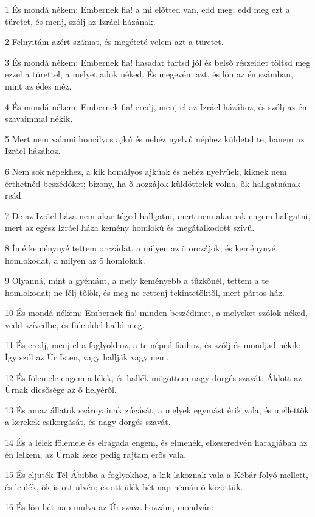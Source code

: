 \par 1 És mondá nékem: Embernek fia! a mi elõtted van, edd meg; edd meg ezt a türetet, és menj, szólj az Izráel házának.
\par 2 Felnyitám azért számat, és megéteté velem azt a türetet.
\par 3 És mondá nékem: Embernek fia! hasadat tartsd jól és belsõ részeidet töltsd meg ezzel a türettel, a melyet adok néked. És megevém azt, és lõn az én számban, mint az édes méz.
\par 4 És mondá nékem: Embernek fia! eredj, menj el az Izráel házához, és szólj az én szavaimmal nékik.
\par 5 Mert nem valami homályos ajkú és nehéz nyelvû néphez küldetel te, hanem az Izráel házához.
\par 6 Nem sok népekhez, a kik homályos ajkúak és nehéz nyelvûek, kiknek nem érthetnéd beszédöket; bizony, ha õ hozzájok küldöttelek volna, õk hallgatnának reád.
\par 7 De az Izráel háza nem akar téged hallgatni, mert nem akarnak engem hallgatni, mert az egész Izráel háza kemény homlokú és megátalkodott szívû.
\par 8 Ímé keménynyé tettem orczádat, a milyen az õ orczájok, és keménynyé homlokodat, a milyen az õ homlokuk.
\par 9 Olyanná, mint a gyémánt, a mely keményebb a tûzkõnél, tettem a te homlokodat; ne félj tõlök, és meg ne rettenj tekintetöktõl, mert pártos ház.
\par 10 És mondá nékem: Embernek fia! minden beszédimet, a melyeket szólok néked, vedd szívedbe, és füleiddel halld meg.
\par 11 És eredj, menj el a foglyokhoz, a te néped fiaihoz, és szólj és mondjad nékik: Így szól az Úr Isten, vagy hallják vagy nem.
\par 12 És fölemele engem a lélek, és hallék mögöttem nagy dörgés szavát: Áldott az Úrnak dicsõsége az õ helyérõl.
\par 13 És amaz állatok szárnyainak zúgását, a melyek egymást érik vala, és mellettök a kerekek csikorgását, és nagy dörgés szavát.
\par 14 És a lélek fölemele és elragada engem, és elmenék, elkeseredvén haragjában az én lelkem, az Úrnak keze pedig rajtam erõs vala.
\par 15 És eljuték Tél-Ábibba a foglyokhoz, a kik lakoznak vala a Kébár folyó mellett, és leülék, õk is ott ülvén; és ott ülék hét nap némán õ közöttük.
\par 16 És lõn hét nap mulva az Úr szava hozzám, mondván:
